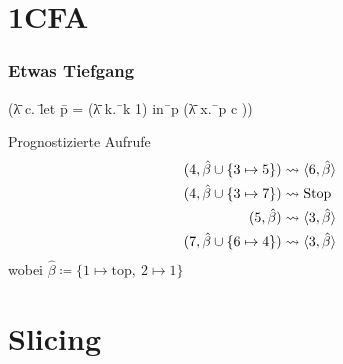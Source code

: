 \documentclass{beamer}
\begin{document}
\section{1CFA}


\begin{frame}
\frametitle{Etwas Tiefgang}

{\ttfamily
\begin{tabbing}
(\=λ c. \=let \=p = (\=λ k.\=\ k 1) in\=\ p (\=λ x.\=\ p c ))\\
\> \> \> \> \> \>  \>  \>  
\end{tabbing}
}

\begin{block}{Prognostizierte Aufrufe}
\begin{align*}
(4, \hat\beta \cup \{ 3 \mapsto 5\}) &\leadsto \langle6, \hat\beta\rangle \\
(4, \hat\beta \cup \{ 3 \mapsto 7\}) &\leadsto \text{Stop} \\
(5, \hat\beta) &\leadsto \langle3, \hat\beta\rangle \\
(7, \hat\beta \cup \{ 6 \mapsto 4 \}) &\leadsto \langle3, \hat\beta\rangle 
\end{align*}
\hfill wobei $\hat\beta \coloneqq \{ 1 \mapsto \text{top},\ 2 \mapsto 1\}$
\end{block}
\end{frame}


\section{Slicing}
\end{document}

